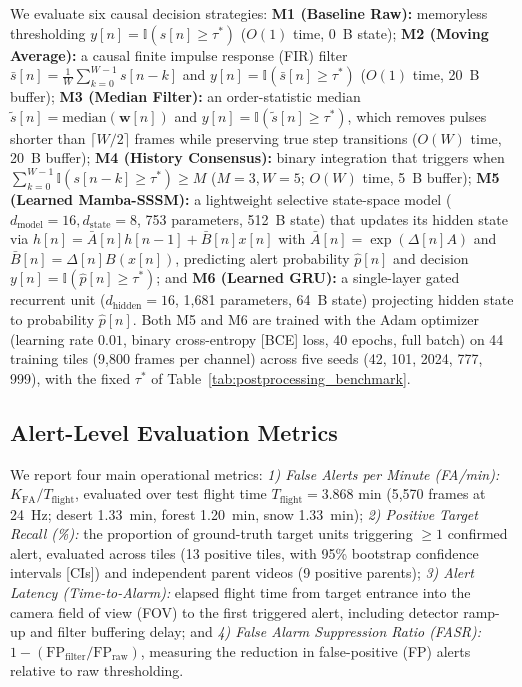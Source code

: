 \documentclass[conference]{IEEEtran}
\begin{document}
We evaluate six causal decision strategies:
\textbf{M1 (Baseline Raw):} memoryless thresholding $y[n] = \mathbb{I}(s[n] \ge \tau^*)$ ($O(1)$ time, 0~B state);
\textbf{M2 (Moving Average):} a causal finite impulse response (FIR) filter $\bar{s}[n] = \frac{1}{W}\sum_{k=0}^{W-1} s[n-k]$ and $y[n] = \mathbb{I}(\bar{s}[n] \ge \tau^*)$ ($O(1)$ time, 20~B buffer);
\textbf{M3 (Median Filter):} an order-statistic median $\tilde{s}[n] = \text{median}(\mathbf{w}[n])$ and $y[n] = \mathbb{I}(\tilde{s}[n] \ge \tau^*)$, which removes pulses shorter than $\lceil W/2 \rceil$ frames while preserving true step transitions ($O(W)$ time, 20~B buffer);
\textbf{M4 (History Consensus):} binary integration that triggers when $\sum_{k=0}^{W-1} \mathbb{I}(s[n-k] \ge \tau^*) \ge M$ ($M=3, W=5$; $O(W)$ time, 5~B buffer);
\textbf{M5 (Learned Mamba-SSSM):} a lightweight selective state-space model ($d_{\text{model}}=16, d_{\text{state}}=8$, 753 parameters, 512~B state) that updates its hidden state via $h[n]=\bar{A}[n]h[n-1]+\bar{B}[n]x[n]$ with $\bar{A}[n]=\exp(\Delta[n]A)$ and $\bar{B}[n]=\Delta[n]B(x[n])$, predicting alert probability $\hat{p}[n]$ and decision $y[n]=\mathbb{I}(\hat{p}[n]\ge \tau^*)$; and
\textbf{M6 (Learned GRU):} a single-layer gated recurrent unit ($d_{\text{hidden}}=16$, 1,681 parameters, 64~B state) projecting hidden state to probability $\hat{p}[n]$.
Both M5 and M6 are trained with the Adam optimizer (learning rate $0.01$, binary cross-entropy [BCE] loss, 40 epochs, full batch) on 44 training tiles (9,800 frames per channel) across five seeds (42, 101, 2024, 777, 999), with the fixed $\tau^*$ of Table~\ref{tab:postprocessing_benchmark}.

\subsection{Alert-Level Evaluation Metrics}
We report four main operational metrics:
\textit{1) False Alerts per Minute (FA/min):} $K_{\text{FA}} / T_{\text{flight}}$, evaluated over test flight time $T_{\text{flight}} = 3.868\text{ min}$ (5,570 frames at 24~Hz; desert 1.33~min, forest 1.20~min, snow 1.33~min);
\textit{2) Positive Target Recall (\%):} the proportion of ground-truth target units triggering $\ge 1$ confirmed alert, evaluated across tiles (13 positive tiles, with 95\% bootstrap confidence intervals [CIs]) and independent parent videos (9 positive parents);
\textit{3) Alert Latency (Time-to-Alarm):} elapsed flight time from target entrance into the camera field of view (FOV) to the first triggered alert, including detector ramp-up and filter buffering delay; and
\textit{4) False Alarm Suppression Ratio (FASR):} $1 - (\text{FP}_{\text{filter}} / \text{FP}_{\text{raw}})$, measuring the reduction in false-positive (FP) alerts relative to raw thresholding.
\end{document}
